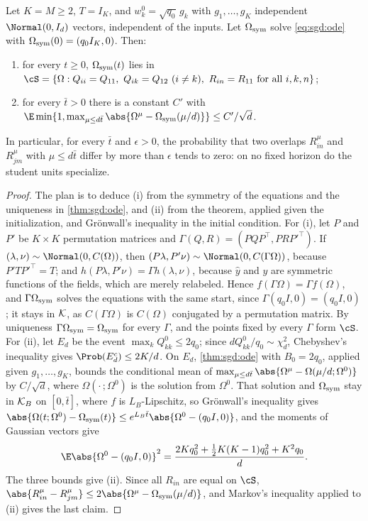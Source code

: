 \begin{refsection}
\begin{corollary}\label{cor:sgd:plateau}
Let $K=M\ge2$, $T=I_K$, and $w_k^0=\sqrt{q_0}\,g_k$ with $g_1,\dots,g_K$ independent $\Normal(0,I_d)$ vectors, independent of the inputs. Let $\Omega_{\mathrm{sym}}$ solve \eqref{eq:sgd:ode} with $\Omega_{\mathrm{sym}}(0)=(q_0I_K,0)$. Then:
\begin{enumerate}
\item for every $t\ge0$, $\Omega_{\mathrm{sym}}(t)$ lies in $\cS=\{\Omega:Q_{ii}=Q_{11},\ Q_{ik}=Q_{12}\ (i\ne k),\ R_{in}=R_{11}\text{ for all }i,k,n\}$;
\item for every $\bar t>0$ there is a constant $C'$ with $\E\min\{1,\max_{\mu\le d\bar t}\abs{\Omega^\mu-\Omega_\sgdsym(\mu/d)}\}\le C'/\sqrt d$.
\end{enumerate}
In particular, for every $\bar t$ and $\epsilon>0$, the probability that two overlaps $R^\mu_{in}$ and $R^\mu_{jm}$ with $\mu\le d\bar t$ differ by more than $\epsilon$ tends to zero: on no fixed horizon do the student units specialize.
\end{corollary}

\begin{proof}
The plan is to deduce (i) from the symmetry of the equations and the uniqueness in \cref{thm:sgd:ode}, and (ii) from the theorem, applied given the initialization, and Grönwall's inequality in the initial condition. For (i), let $P$ and $P'$ be $K\times K$ permutation matrices and $\Gamma(Q,R)=(PQP^\top,PRP'^\top)$. If $(\lambda,\nu)\sim\Normal(0,C(\Omega))$, then $(P\lambda,P'\nu)\sim\Normal(0,C(\Gamma\Omega))$, because $P'TP'^\top=T$; and $h(P\lambda,P'\nu)=\Gamma h(\lambda,\nu)$, because $\hat y$ and $y$ are symmetric functions of the fields, which are merely relabeled. Hence $f(\Gamma\Omega)=\Gamma f(\Omega)$, and $\Gamma\Omega_{\mathrm{sym}}$ solves the equations with the same start, since $\Gamma(q_0I,0)=(q_0I,0)$; it stays in $\mathcal K$, as $C(\Gamma\Omega)$ is $C(\Omega)$ conjugated by a permutation matrix. By uniqueness $\Gamma\Omega_{\mathrm{sym}}=\Omega_{\mathrm{sym}}$ for every $\Gamma$, and the points fixed by every $\Gamma$ form $\cS$. For (ii), let $E_d$ be the event $\max_kQ^0_{kk}\le2q_0$; since $dQ^0_{kk}/q_0\sim\chi^2_d$, Chebyshev's inequality gives $\Prob(E_d^c)\le2K/d$. On $E_d$, \cref{thm:sgd:ode} with $B_0=2q_0$, applied given $g_1,\dots,g_K$, bounds the conditional mean of $\max_{\mu\le d\bar t}\abs{\Omega^\mu-\Omega(\mu/d;\Omega^0)}$ by $C/\sqrt d$, where $\Omega(\cdot\,;\Omega^0)$ is the solution from $\Omega^0$. That solution and $\Omega_{\mathrm{sym}}$ stay in $\mathcal K_B$ on $[0,\bar t]$, where $f$ is $L_B$-Lipschitz, so Grönwall's inequality gives $\abs{\Omega(t;\Omega^0)-\Omega_\sgdsym(t)}\le e^{L_B\bar t}\abs{\Omega^0-(q_0I,0)}$, and the moments of Gaussian vectors give
\[
\E\abs{\Omega^0-(q_0I,0)}^2=\frac{2Kq_0^2+\frac12K(K-1)q_0^2+K^2q_0}d.
\]
The three bounds give (ii). Since all $R_{in}$ are equal on $\cS$, $\abs{R^\mu_{in}-R^\mu_{jm}}\le2\abs{\Omega^\mu-\Omega_\sgdsym(\mu/d)}$, and Markov's inequality applied to (ii) gives the last claim.
\end{proof}


\end{refsection}
